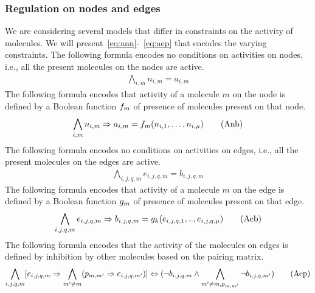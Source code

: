 \subsubsection{Regulation on nodes and edges}
We are considering several models that differ in constraints on
the activity of molecules.
%
We will present~\eqref{eq:ann}-~\eqref{eq:aep} that encodes
the varying constraints.
%
The following formula encodes no conditions on activities on nodes,
i.e., all the present molecules on the nodes are active.
\begin{align}
\bigwedge\limits_{i,m} n_{i,m} = a_{i,m}    \tag{Ann}\label{eq:ann}
\end{align}
The following formula encodes that activity of a molecule $m$ on the node is
defined by a Boolean function $f_m$ of presence of molecules present on that node.
\begin{align}
\bigwedge\limits_{i,m} n_{i,m} \Rightarrow a_{i,m} =  f_m (n_{i,1},\dots,n_{i,\mu}) 
\tag{Anb}\label{eq:anb}
\end{align}
The following formula encodes no conditions on activities on edges,
i.e., all the present molecules on the edges are active.
\begin{align}
  \bigwedge\limits_{i,j,q,m} e_{i,j,q,m} = b_{i,j,q,m}
\tag{Aen}\label{eq:aen}
\end{align}
The following formula encodes that activity of a molecule $m$ on the edge is
defined by a Boolean function $g_m$ of presence of molecules present on that edge.
\begin{align}
   \bigwedge\limits_{i,j,q,m} e_{i,j,q,m} \Rightarrow b_{i,j,q,m} = g_k(e_{i,j,q,1}, .., e_{i,j,q,\mu} )
  \tag{Aeb}\label{eq:aeb}
\end{align}
%
The following formula encodes that the activity of the molecules on
edges is defined by inhibition by other molecules based on the pairing
matrix. 
\begin{align}
   \bigwedge\limits_{i,j,q, m}  [e_{i,j,q,m} \Rightarrow  \bigwedge_{m' \neq m} (p_{m,m'} \Rightarrow e_{i,j,q,m'})] \Leftrightarrow (\neg b_{i,j,q,m} \land  \bigwedge_{m' \neq m, p_{m,m'}} \neg b_{i,j,q,m'})
  \tag{Aep}\label{eq:aep}
\end{align}



